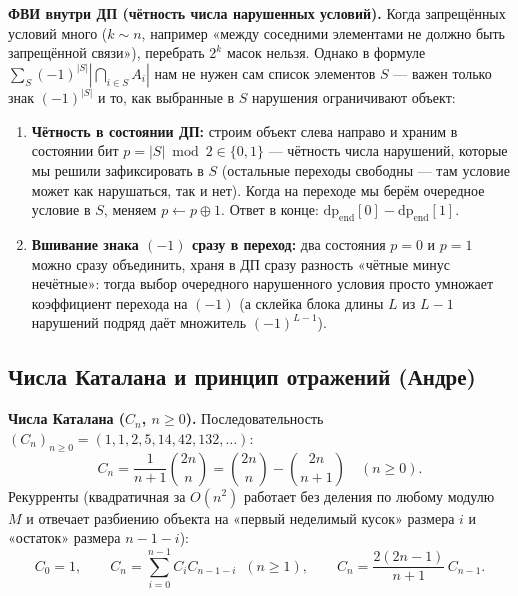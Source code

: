 \documentclass[10pt,a4paper]{article}
\renewcommand{\ge}{\geqslant}
\begin{document}
\textbf{ФВИ внутри ДП (чётность числа нарушенных условий).} Когда запрещённых условий много ($k \sim n$, например «между соседними элементами не должно быть запрещённой связи»), перебрать $2^k$ масок нельзя. Однако в формуле $\sum_S (-1)^{|S|} \left|\bigcap_{i \in S} A_i\right|$ нам не нужен сам список элементов $S$ — важен только знак $(-1)^{|S|}$ и то, как выбранные в $S$ нарушения ограничивают объект:
\begin{enumerate}
  \item \textbf{Чётность в состоянии ДП:} строим объект слева направо и храним в состоянии бит $p = |S| \bmod 2 \in \{0, 1\}$ — чётность числа нарушений, которые мы решили зафиксировать в $S$ (остальные переходы свободны — там условие может как нарушаться, так и нет). Когда на переходе мы берём очередное условие в $S$, меняем $p \leftarrow p \oplus 1$. Ответ в конце: $\mathrm{dp}_{\text{end}}[0] - \mathrm{dp}_{\text{end}}[1]$.
  \item \textbf{Вшивание знака $(-1)$ сразу в переход:} два состояния $p = 0$ и $p = 1$ можно сразу объединить, храня в ДП сразу разность «чётные минус нечётные»: тогда выбор очередного нарушенного условия просто умножает коэффициент перехода на $(-1)$ (а склейка блока длины $L$ из $L - 1$ нарушений подряд даёт множитель $(-1)^{L - 1}$).
\end{enumerate}

\subsection{Числа Каталана и принцип отражений (Андре)}

\textbf{Числа Каталана ($C_n$, $n \ge 0$).} Последовательность $(C_n)_{n \ge 0} = (1, 1, 2, 5, 14, 42, 132, \ldots)$:
\[
  C_n = \frac{1}{n + 1}\binom{2n}{n} = \binom{2n}{n} - \binom{2n}{n + 1} \quad (n \ge 0).
\]
Рекурренты (квадратичная за $O(n^2)$ работает без деления по любому модулю $M$ и отвечает разбиению объекта на «первый неделимый кусок» размера $i$ и «остаток» размера $n - 1 - i$):
\[
  C_0 = 1, \qquad C_n = \sum_{i=0}^{n-1} C_i C_{n - 1 - i} \;\;(n \ge 1), \qquad
  C_n = \frac{2(2n - 1)}{n + 1}\, C_{n - 1}.
\]
\end{document}
